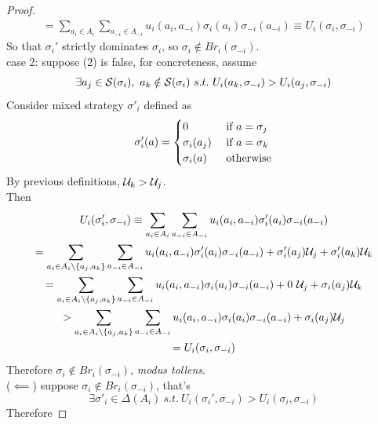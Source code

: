 \documentclass[11pt]{article}
\begin{document}
\begin{proposition}
\begin{proof}
\begin{gather}
				= \sum_{a_i \in A_i} \sum_{a_{-i} \in A_{-i}} u_i(a_i, a_{-i}) \sigma_i(a_i) \sigma_{-i}(a_{-i})
				\equiv U_i(\sigma_i, \sigma_{-i})
				\end{gather}
				So that $\sigma_i'$ strictly dominates $\sigma_i$, so $\sigma_i \notin Br_i(\sigma_{-i})$. \\
				case 2: suppose (2) is false, for concreteness, assume
				\begin{equation}
					\exists a_j \in \mathcal{{S}}(\sigma_i),\ a_k \notin \mathcal{{S}}(\sigma_i)\ s.t.\ U_i(a_k, \sigma_{-i}) > U_i(a_j, \sigma_{-i})
				\end{equation}
				Consider mixed strategy $\sigma'_i$ defined as
				\begin{equation}
					\sigma_i'(a) = \begin{cases}
						0 &\text{{ if }} a = \sigma_j \\
						\sigma_i(a_j) &\text{{ if }} a = \sigma_k \\
						\sigma_i(a) &\text{{ otherwise}}
					\end{cases}
				\end{equation}
				By previous definitions, $\mathcal{{U}}_k > \mathcal{{U}}_j$.\\
				Then
				\begin{gather}
					U_i(\sigma_i', \sigma_{-i}) \equiv \sum_{a_i \in A_i} \sum_{a_{-i} \in A_{-i}} u_i(a_i, a_{-i}) \sigma_i'(a_i) \sigma_{-i}(a_{-i}) \\
					= \sum_{a_i \in A_i\backslash \{a_j, a_k\}} \sum_{a_{-i} \in A_{-i}} u_i(a_i, a_{-i}) \sigma_i'(a_i) \sigma_{-i}(a_{-i}) + \sigma_i'(a_j) \mathcal{{U}}_j + \sigma_i'(a_k) \mathcal{{U}}_k\\
					= \sum_{a_i \in A_i\backslash \{a_j, a_k\}} \sum_{a_{-i} \in A_{-i}} u_i(a_i, a_{-i}) \sigma_i(a_i) \sigma_{-i}(a_{-i}) + 0\  \mathcal{{U}}_j + \sigma_i(a_j) \mathcal{{U}}_k \\
					> \sum_{a_i \in A_i\backslash \{a_j, a_k\}} \sum_{a_{-i} \in A_{-i}} u_i(a_i, a_{-i}) \sigma_i(a_i) \sigma_{-i}(a_{-i}) + \sigma_i(a_j) \mathcal{{U}}_j \\
					= U_i(\sigma_i, \sigma_{-i})
				\end{gather}
				Therefore $\sigma_i \notin Br_i(\sigma_{-i})$, \emph{modus tollens}. \\
				($\impliedby$) suppose $\sigma_i \notin Br_i(\sigma_{-i})$, that's
				\begin{equation}
					\exists \sigma'_i \in \Delta(A_i)\ s.t.\ U_i(\sigma_i', \sigma_{-i}) > U_i(\sigma_i, \sigma_{-i})
				\end{equation}
				Therefore

\end{proof}
\end{proposition}
\end{document}
